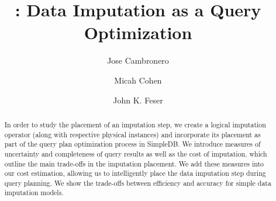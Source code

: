 \documentclass{article}
\title{\ProjectName{}: Data Imputation as a Query Optimization}
\author{
  Jose Cambronero \\
  \and
  Micah Cohen
  \and
  John K. Feser}
\begin{document}
\maketitle

\begin{abstract}
In order to study the placement of an imputation step, we create a logical imputation operator (along with respective physical instances) and incorporate its placement as part of the query plan optimization process in SimpleDB.  We introduce measures of uncertainty and completeness of query results as well as the cost of imputation, which outline the main trade-offs in the imputation placement. We add these measures into our cost estimation, allowing us to intelligently place the data imputation step during query planning. We show the trade-offs between efficiency and accuracy for simple data imputation models. \end{abstract}








\printbibliography
\end{document}
